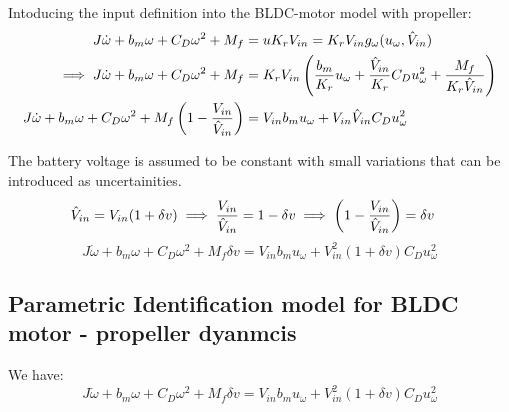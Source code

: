 Intoducing the input definition into the BLDC-motor model with propeller:
\begin{align*}
    J\dot \omega + b_m \omega + C_D \omega^2 + M_f &= u K_r V_{in} = K_r V_{in} g_\omega(u_\omega, \hat V_{in})\\
    \implies  J \dot \omega + b_m \omega + C_D \omega^2 + M_f &= K_r V_{in} \left( \frac{b_m}{K_r} u_\omega + \frac{\hat V_{in}}{K_r} C_D u_\omega^2 + \frac{M_f}{K_r  \hat V_{in}} \right)\\
    J \dot \omega + b_m \omega + C_D \omega^2 + M_f \left( 1 - \frac{V_{in}}{\hat V_{in}} \right) &= V_{in} b_m u_\omega + V_{in} \hat V_{in} C_D u_\omega^2
\end{align*}

 The battery voltage is assumed to be constant with small variations that can be introduced as uncertainities.
\begin{align*}
    \hat V_{in} &= V_{in} ( 1 + \delta v)
    \implies \frac{V_{in}}{\hat V_{in}} = 1 - \delta v
    \implies \left( 1 - \frac{V_{in}}{\hat V_{in}} \right) = \delta v
\end{align*}
\begin{equation}
    J \dot \omega + b_m \omega + C_D \omega^2 + M_f \delta v = V_{in} b_m u_\omega + V_{in}^2 (1 + \delta v) C_D u_\omega^2
\end{equation}

\subsection{Parametric Identification model for BLDC motor - propeller dyanmcis}
We have:
\begin{equation*}
    J \dot \omega + b_m \omega + C_D \omega^2 + M_f \delta v = V_{in} b_m u_\omega + V_{in}^2 (1 + \delta v) C_D u_\omega^2
\end{equation*}




